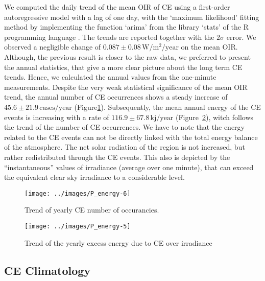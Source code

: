 \documentclass[preprint, 3p,
authoryear]{elsarticle} %
\begin{document}
We computed the daily trend of the mean OIR of CE using a first-order
autoregressive model with a lag of one day, with the `maximum
likelihood' fitting method \citep{Gardner1980, Jones1980} by
implementing the function `arima' from the library `stats' of the R
programming language \citep{RCT2023}. The trends are reported together
with the \(2\sigma\) error. We observed a negligible change of
\(0.087\pm 0.08\,\text{W}/\text{m}^2/\text{year}\) on the mean OIR.
Although, the previous result is closer to the raw data, we preferred to
present the annual statistics, that give a more clear picture about the
long term CE trends. Hence, we calculated the annual values from the
one-minute measurements. Despite the very weak statistical significance
of the mean OIR trend, the annual number of CE occurrences shows a
steady increase of \(45.6\pm 21.9\,\text{cases}/\text{year}\)
(Figure\nobreakspace{}\ref{fig:P-energy-N}). Subsequently, the mean
annual energy of the CE events is increasing with a rate of
\(116.9\pm 67.8\,\text{kj}/\text{year}\)
(Figure~\ref{fig:P-energy-sum}), witch follows the trend of the number
of CE occurrences. We have to note that the energy related to the CE
events can not be directly linked with the total energy balance of the
atmosphere. The net solar radiation of the region is not increased, but
rather redistributed through the CE events. This also is depicted by the
``instantaneous'' values of irradiance (average over one minute), that
can exceed the equivalent clear sky irradiance to a considerable level.

\begin{figure}

{\centering \texttt{[image: ../images/P\_energy-6]} 

}

\caption{Trend of yearly CE number of occurancies.}\label{fig:P-energy-N}
\end{figure}

\begin{figure}

{\centering \texttt{[image: ../images/P\_energy-5]} 

}

\caption{Trend of the yearly excess energy due to CE over irradiance}\label{fig:P-energy-sum}
\end{figure}

\hypertarget{ce-climatology}{%
\subsection{CE Climatology}\label{ce-climatology}}
\end{document}
